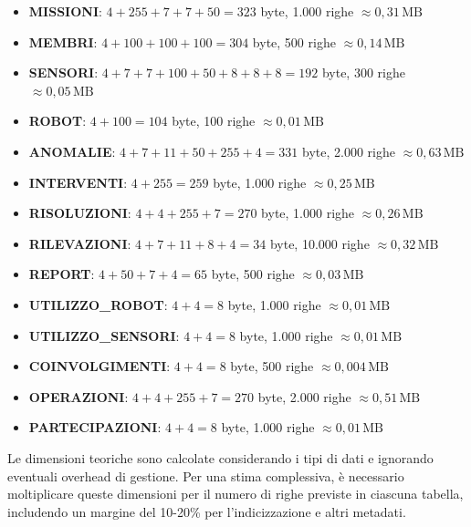 \begin{itemize}
    \item \textbf{MISSIONI}: $4 + 255 + 7 + 7 + 50 = 323$ byte, 1.000 righe \(\approx 0,31\,\text{MB}\)
    \item \textbf{MEMBRI}: $4 + 100 + 100 + 100 = 304$ byte, 500 righe \(\approx 0,14\,\text{MB}\)
    \item \textbf{SENSORI}: $4 + 7 + 7 + 100 + 50 + 8 + 8 + 8 = 192$ byte, 300 righe \(\approx 0,05\,\text{MB}\)
    \item \textbf{ROBOT}: $4 + 100 = 104$ byte, 100 righe \(\approx 0,01\,\text{MB}\)
    \item \textbf{ANOMALIE}: $4 + 7 + 11 + 50 + 255 + 4 = 331$ byte, 2.000 righe \(\approx 0,63\,\text{MB}\)
    \item \textbf{INTERVENTI}: $4 + 255 = 259$ byte, 1.000 righe \(\approx 0,25\,\text{MB}\)
    \item \textbf{RISOLUZIONI}: $4 + 4 + 255 + 7 = 270$ byte, 1.000 righe \(\approx 0,26\,\text{MB}\)
    \item \textbf{RILEVAZIONI}: $4 + 7 + 11 + 8 + 4 = 34$ byte, 10.000 righe \(\approx 0,32\,\text{MB}\)
    \item \textbf{REPORT}: $4 + 50 + 7 + 4 = 65$ byte, 500 righe \(\approx 0,03\,\text{MB}\)
    \item \textbf{UTILIZZO\_ROBOT}: $4 + 4 = 8$ byte, 1.000 righe \(\approx 0,01\,\text{MB}\)
    \item \textbf{UTILIZZO\_SENSORI}: $4 + 4 = 8$ byte, 1.000 righe \(\approx 0,01\,\text{MB}\)
    \item \textbf{COINVOLGIMENTI}: $4 + 4 = 8$ byte, 500 righe \(\approx 0,004\,\text{MB}\)
    \item \textbf{OPERAZIONI}: $4 + 4 + 255 + 7 = 270$ byte, 2.000 righe \(\approx 0,51\,\text{MB}\)
    \item \textbf{PARTECIPAZIONI}: $4 + 4 = 8$ byte, 1.000 righe \(\approx 0,01\,\text{MB}\)
\end{itemize}

\noindent
Le dimensioni teoriche sono calcolate considerando i tipi di dati e ignorando eventuali overhead di gestione. Per una stima complessiva, è necessario moltiplicare queste dimensioni per il numero di righe previste in ciascuna tabella, includendo un margine del 10-20\% per l'indicizzazione e altri metadati.



